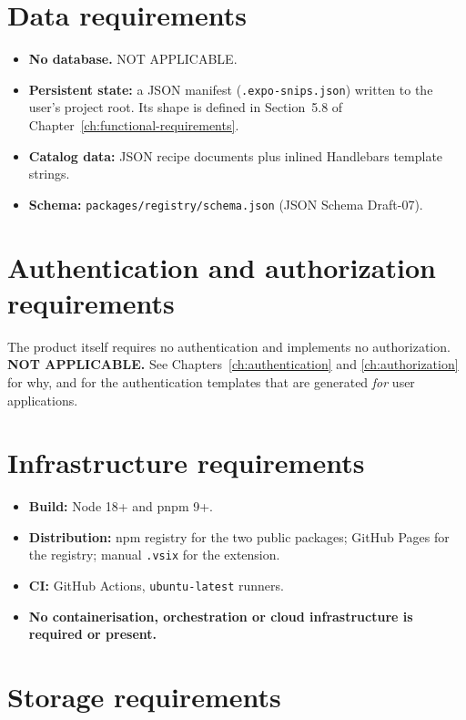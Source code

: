 \section{Data requirements}

\begin{itemize}
  \item \textbf{No database.} NOT APPLICABLE.
  \item \textbf{Persistent state:} a JSON manifest (\texttt{.expo-snips.json})
        written to the user's project root. Its shape is defined in
        Section~5.8 of Chapter~\ref{ch:functional-requirements}.
  \item \textbf{Catalog data:} JSON recipe documents plus inlined Handlebars
        template strings.
  \item \textbf{Schema:} \texttt{packages/registry/schema.json}
        (JSON Schema Draft-07).
\end{itemize}

\section{Authentication and authorization requirements}

The product itself requires no authentication and implements no authorization.
\textbf{NOT APPLICABLE.} See Chapters~\ref{ch:authentication} and
\ref{ch:authorization} for why, and for the authentication templates that are
generated \emph{for} user applications.

\section{Infrastructure requirements}

\begin{itemize}
  \item \textbf{Build:} Node 18+ and pnpm 9+.
  \item \textbf{Distribution:} npm registry for the two public packages; GitHub
        Pages for the registry; manual \texttt{.vsix} for the extension.
  \item \textbf{CI:} GitHub Actions, \texttt{ubuntu-latest} runners.
  \item \textbf{No containerisation, orchestration or cloud infrastructure is
        required or present.}
\end{itemize}

\section{Storage requirements}

